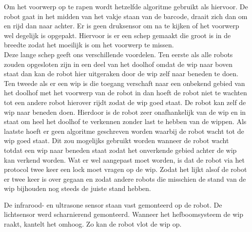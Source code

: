 \documentclass[tt3]{penoverslag}
\begin{document}
Om het voorwerp op te rapen wordt hetzelfde algoritme gebruikt als hiervoor. De robot gaat in het midden van het vakje staan van de barcode, draait zich dan om en rijd dan naar achter. Er is geen druksensor om na te kijken of het voorwerp wel degelijk is opgepakt. Hiervoor is er een schep gemaakt die groot is in de breedte zodat het moeilijk is om het voorwerp te missen. \\

Deze lange schep geeft ons verschillende voordelen. Ten eerste als alle robots zouden opgesloten zijn in een deel van het doolhof omdat de wip naar boven staat dan kan de robot hier uitgeraken door de wip zelf naar beneden te doen. Ten tweede als er een wip is die toegang verschaft naar een onbekend gebied van het doolhof met het voorwerp van de robot in dan hoeft de robot niet te wachten tot een andere robot hierover rijdt zodat de wip goed staat. De robot kan zelf de wip naar beneden doen. Hierdoor is de robot zeer onafhankelijk van de wip en in staat om heel het doolhof te verkennen zonder last te hebben van de wippen. Als laatste hoeft er geen algoritme geschreven worden waarbij de robot wacht tot de wip goed staat. Dit zou mogelijks gebruikt worden wanneer de robot wacht totdat een wip naar beneden staat zodat het onverkende gebied achter de wip kan verkend worden. 
Wat er wel aangepast moet worden, is dat de robot via het protocol twee keer een lock moet vragen op de wip. Zodat het lijkt alsof de robot er twee keer is over gegaan en zodat andere robots die misschien de stand van de wip bijhouden nog steeds de juiste stand hebben.


De infrarood- en ultrasone sensor staan vast gemonteerd op de robot. De lichtsensor werd scharnierend gemonteerd. Wanneer het hefboomsysteem de wip raakt, kantelt het omhoog. Zo kan de robot vlot de wip op.

\end{document}

